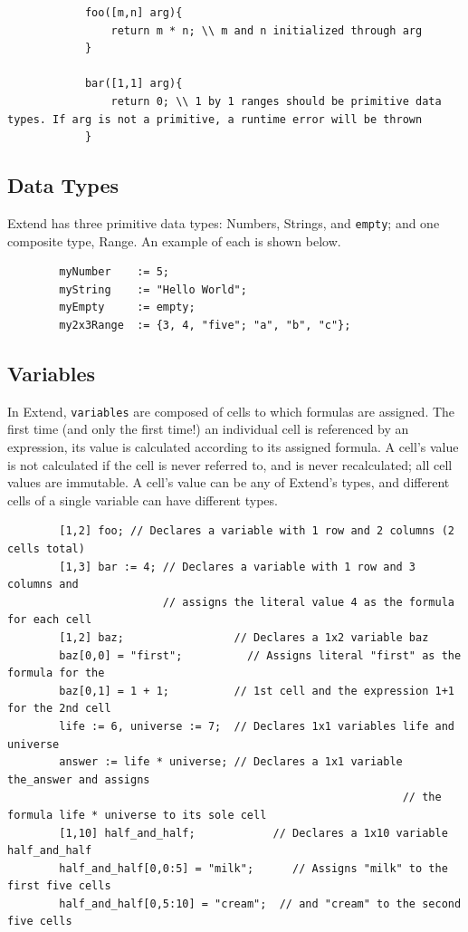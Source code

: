		\begin{lstlisting}
			foo([m,n] arg){
				return m * n; \\ m and n initialized through arg
			}

			bar([1,1] arg){
				return 0; \\ 1 by 1 ranges should be primitive data types. If arg is not a primitive, a runtime error will be thrown
			}
		\end{lstlisting}

	\subsection{Data Types}
	Extend has three primitive data types: Numbers, Strings, and \texttt{empty}; and one composite type, Range. An example of each is shown below.

	\begin{lstlisting}
		myNumber    := 5;
		myString    := "Hello World";
		myEmpty     := empty;
		my2x3Range  := {3, 4, "five"; "a", "b", "c"};
	\end{lstlisting}

	\subsection{Variables}
	In Extend, \texttt{variables} are composed of cells to which formulas are assigned. The first time (and only the first time!) an individual cell is referenced by an expression, its value is calculated according to its assigned formula. A cell's value is not calculated if the cell is never referred to, and is never recalculated; all cell values are immutable. A cell's value can be any of Extend's types, and different cells of a single variable can have different types.

	\begin{lstlisting}
		[1,2] foo; // Declares a variable with 1 row and 2 columns (2 cells total)
		[1,3] bar := 4; // Declares a variable with 1 row and 3 columns and
		                // assigns the literal value 4 as the formula for each cell
		[1,2] baz;                 // Declares a 1x2 variable baz
		baz[0,0] = "first";   		 // Assigns literal "first" as the formula for the
		baz[0,1] = 1 + 1;          // 1st cell and the expression 1+1 for the 2nd cell
		life := 6, universe := 7;  // Declares 1x1 variables life and universe
		answer := life * universe; // Declares a 1x1 variable the_answer and assigns
															 // the formula life * universe to its sole cell
		[1,10] half_and_half;			 // Declares a 1x10 variable half_and_half
		half_and_half[0,0:5] = "milk";		// Assigns "milk" to the first five cells
		half_and_half[0,5:10] = "cream";  // and "cream" to the second five cells
	\end{lstlisting}

